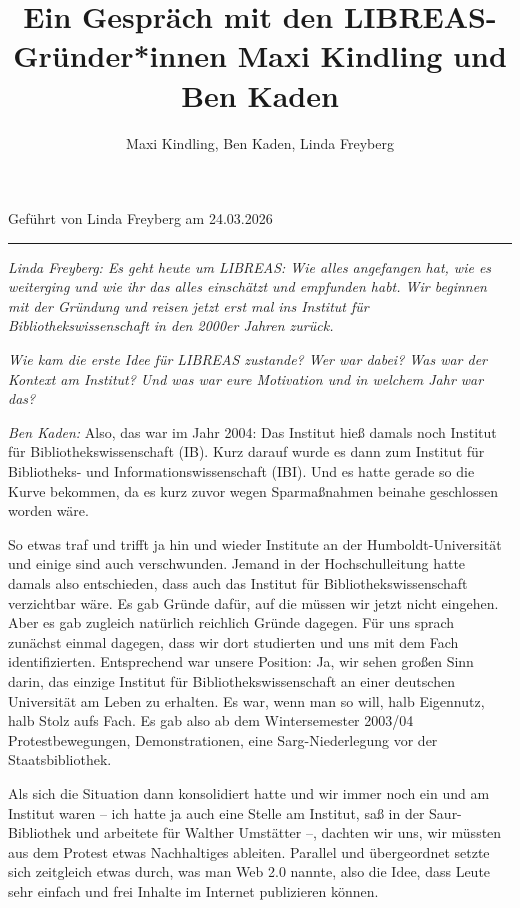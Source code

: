 \documentclass[a4paper,
fontsize=11pt,
oneside,
numbers=noperiodatend,
parskip=half-,
bibliography=totoc,
final
]{scrartcl}
\title{\LARGE{Ein Gespräch mit den LIBREAS-Gründer*innen Maxi Kindling und Ben Kaden}}%
\author{Maxi Kindling, Ben Kaden, Linda Freyberg} %
\date{}
\begin{document}
\maketitle
\thispagestyle{fancyplain} 


Geführt von Linda Freyberg am 24.03.2026

\begin{center}\rule{0.5\linewidth}{0.5pt}\end{center}

\emph{Linda Freyberg: Es geht heute um LIBREAS: Wie alles angefangen
hat, wie es weiterging und wie ihr das alles einschätzt und empfunden
habt. Wir beginnen mit der Gründung und reisen jetzt erst mal ins
Institut für Bibliothekswissenschaft in den 2000er Jahren zurück.}

\emph{Wie kam die erste Idee für LIBREAS zustande? Wer war dabei? Was
war der Kontext am Institut? Und was war eure Motivation und in welchem
Jahr war das?}

\emph{Ben Kaden:} Also, das war im Jahr 2004: Das Institut hieß damals
noch Institut für Bibliothekswissenschaft (IB). Kurz darauf wurde es
dann zum Institut für Bibliotheks- und Informationswissenschaft (IBI).
Und es hatte gerade so die Kurve bekommen, da es kurz zuvor wegen
Sparmaßnahmen beinahe geschlossen worden wäre.

So etwas traf und trifft ja hin und wieder Institute an der
Humboldt-Universität und einige sind auch verschwunden. Jemand in der
Hochschulleitung hatte damals also entschieden, dass auch das Institut
für Bibliothekswissenschaft verzichtbar wäre. Es gab Gründe dafür, auf
die müssen wir jetzt nicht eingehen. Aber es gab zugleich natürlich
reichlich Gründe dagegen. Für uns sprach zunächst einmal dagegen, dass
wir dort studierten und uns mit dem Fach identifizierten. Entsprechend
war unsere Position: Ja, wir sehen großen Sinn darin, das einzige
Institut für Bibliothekswissenschaft an einer deutschen Universität am
Leben zu erhalten. Es war, wenn man so will, halb Eigennutz, halb Stolz
aufs Fach. Es gab also ab dem Wintersemester 2003/04 Protestbewegungen,
Demonstrationen, eine Sarg-Niederlegung vor der Staatsbibliothek.

Als sich die Situation dann konsolidiert hatte und wir immer noch ein
und am Institut waren -- ich hatte ja auch eine Stelle am Institut, saß
in der Saur-Bibliothek und arbeitete für Walther Umstätter --, dachten
wir uns, wir müssten aus dem Protest etwas Nachhaltiges ableiten.
Parallel und übergeordnet setzte sich zeitgleich etwas durch, was man
Web 2.0 nannte, also die Idee, dass Leute sehr einfach und frei Inhalte
im Internet publizieren können.
\end{document}
